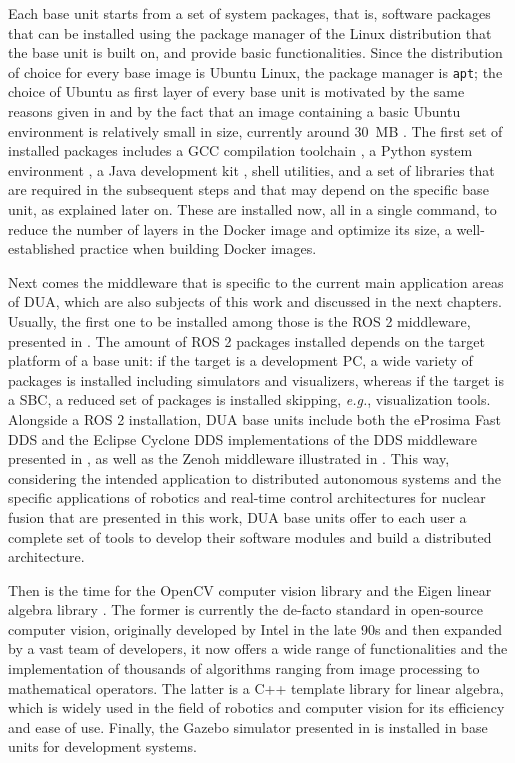 Each base unit starts from a set of system packages, that is, software packages that can be installed using the package manager of the Linux distribution that the base unit is built on, and provide basic functionalities. Since the distribution of choice for every base image is Ubuntu Linux, the package manager is \texttt{apt}; the choice of Ubuntu as first layer of every base unit is motivated by the same reasons given in  and by the fact that an image containing a basic Ubuntu environment is relatively small in size, currently around \SI{30}{MB} \cite{canonical_ubuntu_nodate-1}. The first set of installed packages includes a GCC compilation toolchain \cite{free_software_foundation_gcc_nodate}, a Python system environment \cite{van_rossum_python_nodate}, a Java development kit \cite{oracle_java_nodate}, shell utilities, and a set of libraries that are required in the subsequent steps and that may depend on the specific base unit, as explained later on. These are installed now, all in a single command, to reduce the number of layers in the Docker image and optimize its size, a well-established practice when building Docker images.

Next comes the middleware that is specific to the current main application areas of DUA, which are also subjects of this work and discussed in the next chapters. Usually, the first one to be installed among those is the ROS 2 middleware, presented in . The amount of ROS 2 packages installed depends on the target platform of a base unit: if the target is a development PC, a wide variety of packages is installed including simulators and visualizers, whereas if the target is a SBC, a reduced set of packages is installed skipping, \emph{e.g.}, visualization tools. Alongside a ROS 2 installation, DUA base units include both the eProsima Fast DDS \cite{eprosima_fast_nodate} and the Eclipse Cyclone DDS \cite{eclipse_foundation_cyclone_nodate} implementations of the DDS middleware presented in , as well as the Zenoh middleware illustrated in . This way, considering the intended application to distributed autonomous systems and the specific applications of robotics and real-time control architectures for nuclear fusion that are presented in this work, DUA base units offer to each user a complete set of tools to develop their software modules and build a distributed architecture.

Then is the time for the OpenCV computer vision library \cite{opencv_team_opencv_nodate,culjak_brief_2012} and the Eigen linear algebra library \cite{jacob_eigen_nodate}. The former is currently the de-facto standard in open-source computer vision, originally developed by Intel in the late 90s and then expanded by a vast team of developers, it now offers a wide range of functionalities and the implementation of thousands of algorithms ranging from image processing to mathematical operators. The latter is a C++ template library for linear algebra, which is widely used in the field of robotics and computer vision for its efficiency and ease of use. Finally, the Gazebo simulator presented in  is installed in base units for development systems.

